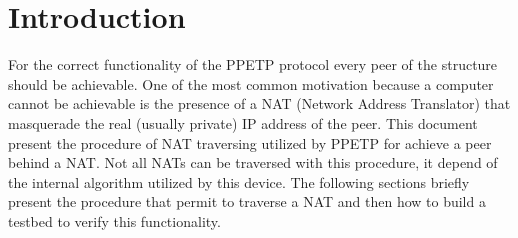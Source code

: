 \section{Introduction}
\label{sec:intro}
For the correct functionality of the PPETP protocol every peer of the structure should be achievable. One of the most common motivation because a computer cannot be achievable is the presence of a NAT (Network Address Translator) that masquerade the real (usually private) IP address of the peer.
This document present the procedure of NAT traversing utilized by PPETP for achieve a peer behind a NAT. Not all NATs can be traversed with this procedure, it depend of the internal algorithm utilized by this device. 
The following sections briefly present the procedure that permit to traverse a NAT and then how to build a testbed to verify this functionality. 